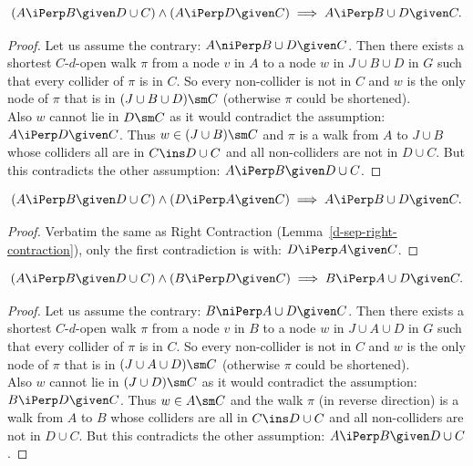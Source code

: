 \begin{Lem}
  \label{d-sep-right-contraction}
    \[ (A \iPerp  B \given D \cup  C) \land (A \iPerp  D \given C)  \implies A \iPerp  B \cup  D \given C.\]
\begin{proof}
    Let us assume the contrary:  $A  \niPerp  B \cup D \given C$.
    Then there exists a shortest $C$-$d$-open walk $\pi$ 
    from a node $v$ in $A$ to a node $w$ in $J \cup B \cup D$ in $G$ such that  every collider of $\pi$ is in $C$.
    So every non-collider is not in $C$ and $w$ is 
    the only node of $\pi$ that is in $(J \cup B \cup D)\sm C$ (otherwise $\pi$ could be shortened). \\
    Also $w$ cannot lie in $D\sm C$ as it would contradict the assumption: $A \iPerp  D \given C$.
    Thus $w \in (J \cup B) \sm C$ and $\pi$ is a walk from $A$ to $J \cup B$ whose colliders all are in $C \ins D \cup C$ 
    and all non-colliders are not in $D \cup C$.
    But this contradicts the other assumption: $A \iPerp  B \given D \cup  C$.
\end{proof}
\end{Lem}

\begin{Lem}
    \[ (A \iPerp  B \given D \cup  C) \land (D \iPerp  A \given C) \implies A  \iPerp  B \cup  D \given C.\]
\begin{proof}
    Verbatim the same as Right Contraction (Lemma~\ref{d-sep-right-contraction}), 
    only the first contradiction is with: $D \iPerp A \given C$.
\end{proof}
\end{Lem}

\begin{Lem}
    \label{d-sep-flc-contraction}
    \[ (A \iPerp  B \given D \cup  C) \land (B \iPerp  D \given C) \implies B \iPerp  A \cup  D \given C.\]
\begin{proof}
    Let us assume the contrary:  $B  \niPerp  A \cup D \given C$.
    Then there exists a shortest $C$-$d$-open walk $\pi$ 
    from a node $v$ in $B$ to a node $w$ in $J \cup A \cup D$ in $G$ such that every collider of $\pi$ is in $C$.
    So every non-collider is not in $C$ and $w$ is 
    the only node of $\pi$ that is in $(J \cup A \cup D)\sm C$ (otherwise $\pi$ could be shortened). \\
    Also $w$ cannot lie in $(J \cup D) \sm C$ as it would contradict the assumption: $B \iPerp  D \given C$.
    Thus $w \in A \sm C$ and the walk $\pi$ (in reverse direction) is a walk from $A$ to $B$ whose colliders are all in 
    $C \ins D \cup C$ 
    and all non-colliders are not in $D \cup C$.
    But this contradicts the other assumption: $A \iPerp  B \given D \cup  C$.
\end{proof}
\end{Lem}


